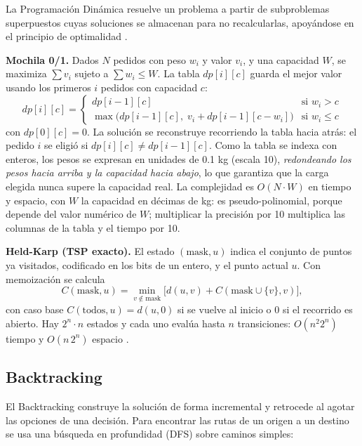 La Programación Dinámica resuelve un problema a partir de subproblemas superpuestos cuyas soluciones se almacenan para no recalcularlas, apoyándose en el principio de optimalidad \citep{bellman1957dynamic}.

\textbf{Mochila 0/1.} Dados $N$ pedidos con peso $w_i$ y valor $v_i$, y una capacidad $W$, se maximiza $\sum v_i$ sujeto a $\sum w_i\le W$. La tabla $dp[i][c]$ guarda el mejor valor usando los primeros $i$ pedidos con capacidad $c$:
\begin{equation}
    dp[i][c]=\begin{cases}dp[i-1][c] & \text{si } w_i>c\\ \max\big(dp[i-1][c],\; v_i+dp[i-1][c-w_i]\big) & \text{si } w_i\le c\end{cases}
\end{equation}
con $dp[0][c]=0$. La solución se reconstruye recorriendo la tabla hacia atrás: el pedido $i$ se eligió si $dp[i][c]\neq dp[i-1][c]$. Como la tabla se indexa con enteros, los pesos se expresan en unidades de 0.1 kg (escala 10), \emph{redondeando los pesos hacia arriba y la capacidad hacia abajo}, lo que garantiza que la carga elegida nunca supere la capacidad real. La complejidad es $O(N\cdot W)$ en tiempo y espacio, con $W$ la capacidad en décimas de kg: es pseudo-polinomial, porque depende del valor numérico de $W$; multiplicar la precisión por 10 multiplica las columnas de la tabla y el tiempo por 10.

\textbf{Held-Karp (TSP exacto).} El estado $(\text{mask},u)$ indica el conjunto de puntos ya visitados, codificado en los bits de un entero, y el punto actual $u$. Con memoización se calcula
\begin{equation}
    C(\text{mask},u)=\min_{v\notin\text{mask}}\big[d(u,v)+C(\text{mask}\cup\{v\},v)\big],
\end{equation}
con caso base $C(\text{todos},u)=d(u,0)$ si se vuelve al inicio o $0$ si el recorrido es abierto. Hay $2^n\cdot n$ estados y cada uno evalúa hasta $n$ transiciones: $O(n^2 2^n)$ tiempo y $O(n\,2^n)$ espacio \citep{held1962dynamic}.

\subsection{Backtracking}

El Backtracking construye la solución de forma incremental y retrocede al agotar las opciones de una decisión. Para encontrar las rutas de un origen a un destino se usa una búsqueda en profundidad (DFS) sobre caminos simples:

